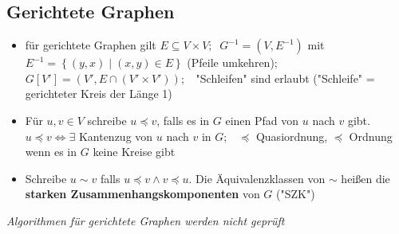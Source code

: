 \documentclass[10pt,a4paper]{article}
\begin{document}
\subsection{Gerichtete Graphen}
\begin{itemize}
\item für gerichtete Graphen gilt $E\subseteq V\times V;\;\;G^{-1}=(V,E^{-1})$ mit $E^{-1}=\left\lbrace (y,x)\mid (x,y)\in E\right\rbrace$ (Pfeile umkehren);\\ 
$G[V']=(V',E\cap (V'\times V'));\;\;$ "Schleifen" sind erlaubt ("Schleife" = gerichteter Kreis der Länge 1)
\item Für $u,v\in V$ schreibe $u\preceq v$, falls es in $G$ einen Pfad von $u$ nach $v$ gibt. $u\preceq v \Leftrightarrow \exists$ Kantenzug von $u$ nach $v$ in $G;\;\;\;
\preceq $ Quasiordnung, $\preceq$ Ordnung wenn es in $G$ keine Kreise gibt 
\item Schreibe $u \sim v$ falls $u\preceq v \land v\preceq u$. Die Äquivalenzklassen von $\sim$ heißen die \textbf{starken Zusammenhangskomponenten} von $G$ ("SZK")


\end{itemize}
\textit{Algorithmen für gerichtete Graphen werden nicht geprüft}
\end{document}
